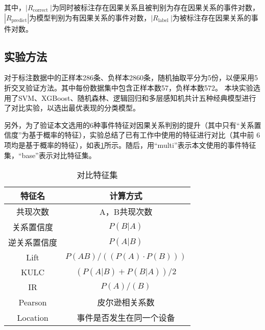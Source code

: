 其中，$\left|R_{\text {correct }}\right|$为同时被标注存在因果关系且被判别为存在因果关系的事件对数，$|R_{\text {predict}}|$为模型判别为有因果关系的事件对数，$\left|R_{\text {label }}\right|$为被标注存在因果关系的事件对数。

\subsection{实验方法}
对于标注数据中的正样本286条、负样本2860条，随机抽取平分为5份，以便采用5折交叉验证方法。其中每份数据集中包含正样本数57，负样本数572。
本块实验选用了SVM、XGBoost、随机森林、逻辑回归和多层感知机共计五种经典模型进行了对比实验，以选出最优表现的分类模型。

另外，为了验证本文选用的6种事件特征对因果关系判别的提升（其中只有“关系置信度”为基于概率的特征），实验总结了已有工作中使用的特征进行对比（其中前 6 项均是基于概率的特征），如表\ref{only-prob-feature}所示。随后，用“multi”表示本文使用的事件特征集，“base”表示对比特征集。
\begin{table}[htbp]
    \caption{对比特征集}
    \centering
    \label{only-prob-feature}
    \begin{tabular}{cc}
    \toprule[2pt]
    特征名    & 计算方式                  \\ \midrule[2pt]
    共现次数\cite{liu1998integrating}   & A，B共现次数               \\
    关系置信度\cite{liu1998integrating}  & $P(B|A)$                \\
    逆关系置信度\cite{liu1998integrating} & $P(A|B)$                \\
    Lift\cite{liu1998integrating}  & $P(AB)/((P(A) \cdot P(B)))$ \\
    KULC\cite{liu1998integrating}   & $(P(A|B) + P(B|A))/2$   \\
    IR\cite{liu1998integrating}    & $P(A)/(B)$              \\ 
    Pearson\cite{mahimkar2008troubleshooting} & 皮尔逊相关系数         \\
    Location\cite{nie2016mining-causality-graph}  & 事件是否发生在同一个设备 \\ 
    \bottomrule[2pt]
    \end{tabular}
    \end{table}

